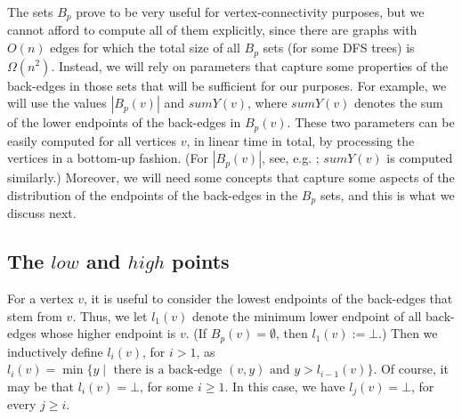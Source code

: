 \documentclass[11pt,a4paper]{article}
\begin{document}
The sets $B_p$ prove to be very useful for vertex-connectivity purposes, but we cannot afford to compute all of them explicitly, since there are graphs with $O(n)$ edges for which the total size of all $B_p$ sets (for some DFS trees) is $\Omega(n^2)$. Instead, we will rely on parameters that capture some properties of the back-edges in those sets that will be sufficient for our purposes. For example, we will use the values $|B_p(v)|$ and $\mathit{sumY}(v)$, where $\mathit{sumY}(v)$ denotes the sum of the lower endpoints of the back-edges in $B_p(v)$. These two parameters can be easily computed for all vertices $v$, in linear time in total, by processing the vertices in a bottom-up fashion. (For $|B_p(v)|$, see, e.g. \cite{DBLP:conf/isaac/GeorgiadisK20}; $\mathit{sumY}(v)$ is computed similarly.) Moreover, we will need some concepts that capture some aspects of the distribution of the endpoints of the back-edges in the $B_p$ sets, and this is what we discuss next.

\subsection{The $\mathit{low}$ and $\mathit{high}$ points}
\label{section:dfs_highlow}
For a vertex $v$, it is useful to consider the lowest endpoints of the back-edges that stem from $v$. Thus, we let $l_1(v)$ denote the minimum lower endpoint of all back-edges whose higher endpoint is $v$. (If $B_p(v)=\emptyset$, then $l_1(v):=\bot$.) Then we inductively define $l_i(v)$, for $i>1$, as $l_i(v)=\min\{y\mid \mbox{ there is a back-edge } (v,y) \mbox{ and } y>l_{i-1}(v)\}$. Of course, it may be that $l_i(v)=\bot$, for some $i\geq 1$. In this case, we have $l_j(v)=\bot$, for every $j\geq i$.
\end{document}
